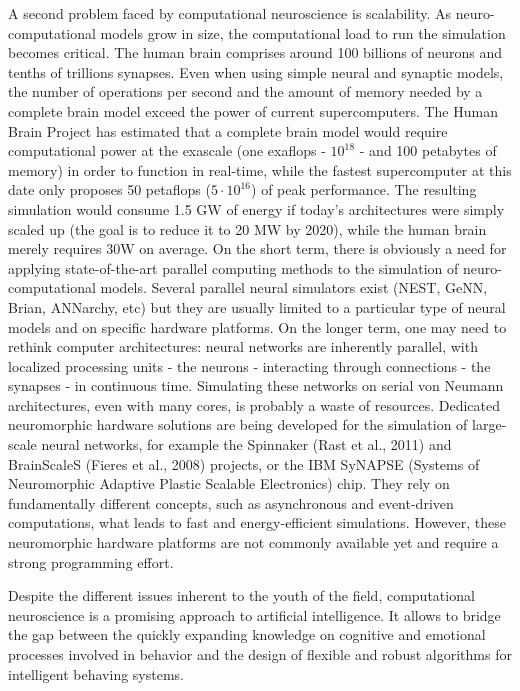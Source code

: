 \documentclass[
  11pt,
  a4paper,
]{scrbook}
\begin{document}
A second problem faced by computational neuroscience is scalability. As
neuro-computational models grow in size, the computational load to run
the simulation becomes critical. The human brain comprises around 100
billions of neurons and tenths of trillions synapses. Even when using
simple neural and synaptic models, the number of operations per second
and the amount of memory needed by a complete brain model exceed the
power of current supercomputers. The Human Brain Project has estimated
that a complete brain model would require computational power at the
exascale (one exaflops - \(10^{18}\) - and 100 petabytes of memory) in
order to function in real-time, while the fastest supercomputer at this
date only proposes 50 petaflops (\(5 \cdot 10^{16}\)) of peak
performance. The resulting simulation would consume 1.5 GW of energy if
today's architectures were simply scaled up (the goal is to reduce it to
20 MW by 2020), while the human brain merely requires 30W on average. On
the short term, there is obviously a need for applying state-of-the-art
parallel computing methods to the simulation of neuro-computational
models. Several parallel neural simulators exist (NEST, GeNN, Brian,
ANNarchy, etc) but they are usually limited to a particular type of
neural models and on specific hardware platforms. On the longer term,
one may need to rethink computer architectures: neural networks are
inherently parallel, with localized processing units - the neurons -
interacting through connections - the synapses - in continuous time.
Simulating these networks on serial von Neumann architectures, even with
many cores, is probably a waste of resources. Dedicated neuromorphic
hardware solutions are being developed for the simulation of large-scale
neural networks, for example the Spinnaker (Rast et al., 2011) and
BrainScaleS (Fieres et al., 2008) projects, or the IBM SyNAPSE (Systems
of Neuromorphic Adaptive Plastic Scalable Electronics) chip. They rely
on fundamentally different concepts, such as asynchronous and
event-driven computations, what leads to fast and energy-efficient
simulations. However, these neuromorphic hardware platforms are not
commonly available yet and require a strong programming effort.

Despite the different issues inherent to the youth of the field,
computational neuroscience is a promising approach to artificial
intelligence. It allows to bridge the gap between the quickly expanding
knowledge on cognitive and emotional processes involved in behavior and
the design of flexible and robust algorithms for intelligent behaving
systems.
\end{document}
